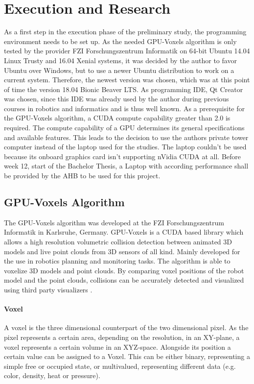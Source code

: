 \chapter{Execution and Research}
\label{chap:execution}
As a first step in the execution phase of the preliminary study, the programming environment needs to be set up. As the needed GPU-Voxels algorithm is only tested by the provider FZI Forschungszentrum Informatik on 64-bit Ubuntu 14.04 Linux Trusty and 16.04 Xenial systems, it was decided by the author to favor Ubuntu over Windows, but to use a newer Ubuntu distribution to work on a current system. Therefore, the newest version was chosen, which was at this point of time the version 18.04 Bionic Beaver LTS.
As programming IDE, Qt Creator was chosen, since this IDE was already used by the author during previous courses in robotics and informatics and is thus well known.
As a prerequisite for the GPU-Voxels algorithm, a CUDA compute capability greater than 2.0 is required. The compute capability of a GPU determines its general specifications and available features. This leads to the decision to use the authors private tower computer instead of the laptop used for the studies. The laptop couldn't be used because its onboard graphics card isn't supporting nVidia CUDA at all. Before week 12, start of the Bachelor Thesis, a Laptop with according performance shall be provided by the AHB to be used for this project.


\section{GPU-Voxels Algorithm\cite{voxels}}
\label{sec:voxels}
The GPU-Voxels algorithm was developed at the FZI Forschungszentrum Informatik in Karlsruhe, Germany. GPU-Voxels is a CUDA based library which allows a high resolution volumetric collision detection between animated 3D models and live point clouds from 3D sensors of all kind. Mainly developed for the use in robotics planning and monitoring tasks. The algorithm is able to voxelize 3D models and point clouds. By comparing voxel positions of the robot model and the point clouds, collisions can be accurately detected and visualized using third party visualizers \cite{GPU-Voxels}.

\subsubsection{Voxel}
A voxel is the three dimensional counterpart of the two dimensional pixel. As the pixel represents a certain area, depending on the resolution, in an XY-plane, a voxel represents a certain volume in an XYZ-space. Alongside its position a certain value can be assigned to a Voxel. This can be either binary, representing a simple free or occupied state, or multivalued, representing different data (e.g. color, density, heat or pressure).

